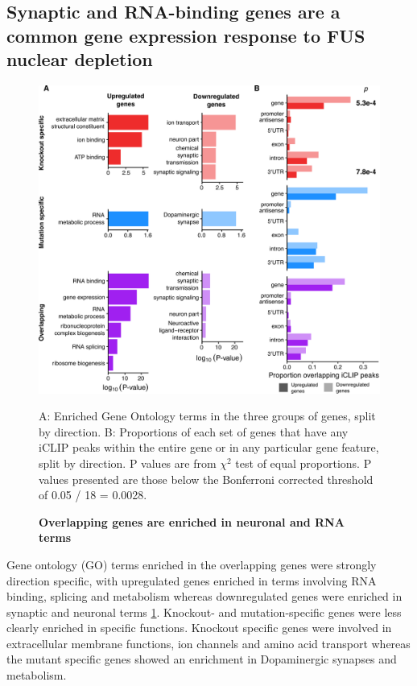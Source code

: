 \subsection{Synaptic and RNA-binding genes are a common gene expression response to FUS nuclear depletion}

\begin{figure}[h!]
	\centering
	\includegraphics[width=\textwidth]{Figures/06_fus_meta/expression_curated_go_terms.png}
	\caption{\textbf{Overlapping genes are enriched in neuronal and RNA terms} }	
	A: Enriched Gene Ontology terms in the three groups of genes, split by direction.
	B: Proportions of each set of genes that have any iCLIP peaks within the entire gene or in any particular gene feature, split by direction. 
	P values are from $\chi^2$ test of equal proportions. P values presented are those below the Bonferroni corrected threshold of 0.05 / 18 = 0.0028. 
	\label{fig:fus_expression_go}
\end{figure}


Gene ontology (GO) terms enriched in the overlapping genes were strongly direction specific, with upregulated genes enriched in terms involving RNA binding, splicing and metabolism whereas downregulated genes were enriched in synaptic and neuronal terms \ref{fig:fus_expression_go}.
Knockout- and mutation-specific genes were less clearly enriched in specific functions. 
Knockout specific genes were involved in extracellular membrane functions, ion channels and amino acid transport whereas the mutant specific genes showed an enrichment in Dopaminergic synapses and metabolism.


